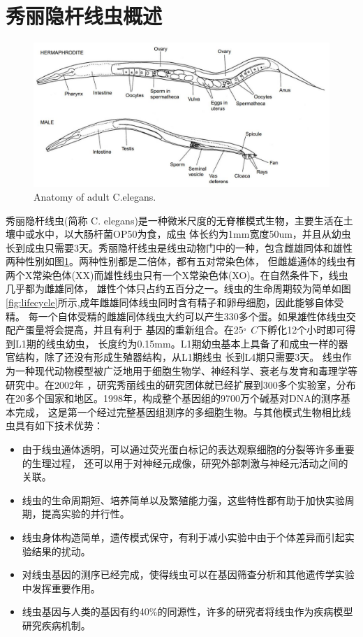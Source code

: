 \section{秀丽隐杆线虫概述}
	\begin{figure}[h]
	  \centering
	  \includegraphics[width=14cm]{figure/chap1/Celegans.jpg}
		{Anatomy of adult C.elegans.}
	  \label{fig:Celegans}
	\end{figure}
	秀丽隐杆线虫(简称 C. elegans)是一种微米尺度的无脊椎模式生物，主要生活在土壤中或水中，以大肠杆菌OP50为食，成虫
	体长约为1mm宽度50um，并且从幼虫长到成虫只需要3天。秀丽隐杆线虫是线虫动物门中的一种，包含雌雄同体和雄性两种性别如图\ref{fig:Celegans}。两种性别都是二倍体，都有五对常染色体，
	但雌雄通体的线虫有两个X常染色体(XX)而雄性线虫只有一个X常染色体(XO)。在自然条件下，线虫几乎都为雌雄同体，
	雄性个体只占约五百分之一。线虫的生命周期较为简单如图\ref{fig:lifecycle}所示,成年雌雄同体线虫同时含有精子和卵母细胞，因此能够自体受精。
	每一个自体受精的雌雄同体线虫大约可以产生330多个蛋。如果雄性体线虫交配产蛋量将会提高，并且有利于
	基因的重新组合。在25$^。C$下孵化12个小时即可得到L1期的线虫幼虫，
	长度约为0.15mm。L1期幼虫基本上具备了和成虫一样的器官结构，除了还没有形成生殖器结构，从L1期线虫
	长到L4期只需要3天。
	线虫作为一种现代动物模型被广泛地用于细胞生物学、神经科学、衰老与发育和毒理学等研究中。在2002年
	，研究秀丽线虫的研究团体就已经扩展到300多个实验室，分布在20多个国家和地区。1998年，构成整个基因组的9700万个碱基对DNA的测序基本完成，
	这是第一个经过完整基因组测序的多细胞生物。与其他模式生物相比线虫具有如下技术优势：
	
	\begin{itemize}
	  \item 由于线虫通体透明，可以通过荧光蛋白标记的表达观察细胞的分裂等许多重要的生理过程，
	  还可以用于对神经元成像，研究外部刺激与神经元活动之间的关联。
	  \item 线虫的生命周期短、培养简单以及繁殖能力强，这些特性都有助于加快实验周期，提高实验的并行性。
	  \item 线虫身体构造简单，遗传模式保守，有利于减小实验中由于个体差异而引起实验结果的扰动。
	  \item 对线虫基因的测序已经完成，使得线虫可以在基因筛查分析和其他遗传学实验中发挥重要作用。
	  \item 线虫基因与人类的基因有约40\%的同源性，许多的研究者将线虫作为疾病模型研究疾病机制。
	\end{itemize}
	


